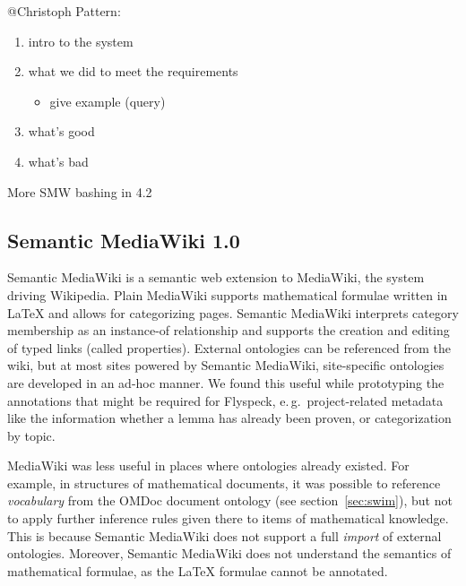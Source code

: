 \begin{todo}{@Christoph}
  Pattern:
  \begin{enumerate}
  \item intro to the system
  \item what we did to meet the requirements
    \begin{itemize}
    \item give example (query)
    \end{itemize}
  \item what's good
  \item what's bad
  \end{enumerate}
  More SMW bashing in 4.2
\end{todo}

\subsection{Semantic MediaWiki 1.0}
\label{sec:smw-study}

Semantic MediaWiki\cite{KrSchVr:semwiki-reasoning07} is a semantic web
extension to MediaWiki, the system driving Wikipedia.  Plain MediaWiki
supports mathematical formulae written in {\LaTeX} and allows for
categorizing pages.  Semantic MediaWiki interprets category membership
as an instance-of relationship and supports the creation and editing
of typed links (called properties).  External ontologies can be
referenced from the wiki, but at most   sites powered by Semantic
MediaWiki, site-specific ontologies are developed in an ad-hoc manner.
We found this useful while prototyping the annotations that might be
required for Flyspeck, e.\,g.\ project-related metadata like the
information whether a lemma has already been proven, or categorization
by topic.  

MediaWiki was less useful in places where ontologies
already existed.  For example, in structures of mathematical
documents, it was possible to reference \emph{vocabulary} from the
OMDoc document ontology (see section~\ref{sec:swim}), but not to apply
further inference rules given there to items of mathematical
knowledge.  This is because Semantic MediaWiki does not support a full
\emph{import} of external ontologies.  Moreover, Semantic MediaWiki does
not understand the semantics of mathematical formulae, as the {\LaTeX}
formulae cannot be annotated.

